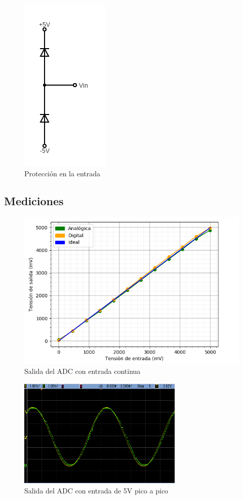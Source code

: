 \documentclass[assd_tp3_main.tex]{subfiles}
\begin{document}
\begin{figure}[H]
	\centering
	\includegraphics[width=0.2 \textwidth]
	{images/ej1/proteccionin.png}
	\caption{Protección en la entrada}
	\label{fig:pin}
\end{figure}




\subsection{Mediciones}

\begin{figure}[htb!]
	\centering
	\includegraphics[width=\textwidth]
	{images/ej2/sar-continua.png}
	\caption{Salida del ADC con entrada continua}
	\label{fig:adc-continua}
\end{figure}

\begin{figure}
	\centering
	\includegraphics[width=0.7\textwidth]
	{images/ej1/mediciones/aa_.png}
	\caption{Salida del ADC con entrada de 5V pico a pico}
	\label{fig:adc-fs}
\end{figure}
\end{document}
